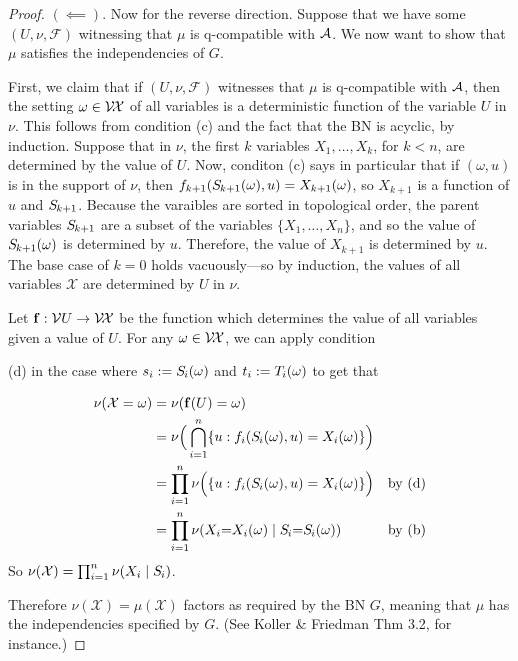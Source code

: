 \documentclass{article}
\newcommand{\X}{\mathcal X}
\begin{document}
\begin{proof}
    \medskip
    
    $(\impliedby)$. 
    Now for the reverse direction. Suppose that we have some $(U, \nu, \mathcal F)$ witnessing that $\mu$ is q-compatible with $\mathcal A$. 
    We now want to show that $\mu$ satisfies the independencies of $G$. 
    
    First, we claim that if $(U, \nu, \mathcal F)$ witnesses that $\mu$ is q-compatible with $\mathcal A$, then the setting $\omega \in \V\!\X$ of all variables is a deterministic function of the variable $U$ in $\nu$. This follows from condition (c) and the fact that the BN is acyclic, by induction.
    Suppose that in $\nu$, the first $k$ variables $X_1, \ldots, X_k$, for $k < n$, are determined by the value of $U$.
    Now, conditon (c) says in particular that if $(\omega, u)$ is in the support of $\nu$, then $f_{k+1}(\Src {k+1}(\omega), u) = X_{k+1}(\omega)$, so $X_{k+1}$ is a function of $u$ and $\Src {k+1}$.
    Because the varaibles are sorted in topological order, the parent variables $\Src {k+1}$ are a subset of the variables $\{X_1, \ldots, X_n\}$, and so the value of $\Src {k+1}(\omega)$ is determined by $u$.
    Therefore, the value of $X_{k+1}$ is determined by $u$. 
    The base case of $k=0$ holds vacuously---so by induction, the values of all variables $\X$ are determined by $U$ in $\nu$. 
    
    Let $\mat f: \V U \to \V \!\X$ be the function which determines the value of all variables given a value of $U$. 
    For any $\omega \in \V\!\X$, we can apply condition 
    
    (d) in the case where $s_i := \Src i(\omega)$ and $t_i := \Tgt i(\omega)$ to get that
    
    \begin{align*}
        \nu(\X = \omega)
        &= \nu(\mat f(U) = \omega)  \\
        &= \nu\Big( \bigcap_{i=1}^n \{ u : f_i(\Src i(\omega), u) = X_i(\omega) \} \Big)\\
        &= \prod_{i = 1}^n \nu\Big(\{ u : f_i(\Src i(\omega), u) = X_i(\omega) \} \Big) 
            &\text{by (d)}\\
        &= \prod_{i = 1}^n \nu(X_i{=}X_i(\omega) \mid \Src i {=} \Src i(\omega)) 
            &\text{by (b)}
    \end{align*}
    So  $\nu(\X) = \prod_{i=1}^n \nu(X_i \mid \Src i)$.
    
    
    Therefore $\nu(\X) = \mu(\X)$ factors as required by the BN $G$, meaning that $\mu$ has the independencies specified by $G$. (See Koller \& Friedman Thm 3.2, for instance.)
\end{proof}
\end{document}
